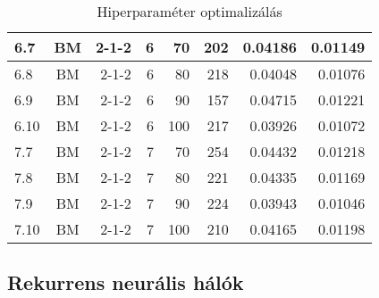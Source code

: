 \documentclass[a4paper, magyar]{article}
\begin{document}
\begin{small}
\begin{table}[p]
\begin{tabular}{|l|c|r|r|r|r|r|r|}
		\hline
		6.7&BM&2-1-2&6&70&202&0.04186&0.01149\\
		\hline
		6.8&BM&2-1-2&6&80&218&0.04048&0.01076\\
		\hline
		6.9&BM&2-1-2&6&90&157&0.04715&0.01221\\
		\hline
		6.10&BM&2-1-2&6&100&217&0.03926&0.01072\\
		\hline
		7.7&BM&2-1-2&7&70&254&0.04432&0.01218\\
		\hline
		7.8&BM&2-1-2&7&80&221&0.04335&0.01169\\
		\hline
		7.9&BM&2-1-2&7&90&224&0.03943&0.01046\\
		\hline
		7.10&BM&2-1-2&7&100&210&0.04165&0.01198\\
		\hline
	\end{tabular}

	
	\caption{Hiperparaméter optimalizálás}
	\label{tab:optim}
\end{table}
\end{small}
\subsection{Rekurrens neurális hálók}



\end{document}
